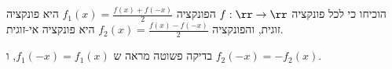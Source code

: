 הוכיחו כי לכל פונקציה
$f: \rr \rightarrow \rr$
הפונקציה
$f_1(x) = \frac{f(x) + f(-x)}{2}$
היא פונקציה זוגית,  והפונקציה
$f_2(x) = \frac{f(x) - f(-x)}{2}$
היא פונקציה אי-זוגית.
\begin{solbox}
בדיקה פשוטה מראה ש
$f_1( -x) = f_1(x) $,
  ו
  $f_2( -x) = -f_2(x) $.
\end{solbox}
